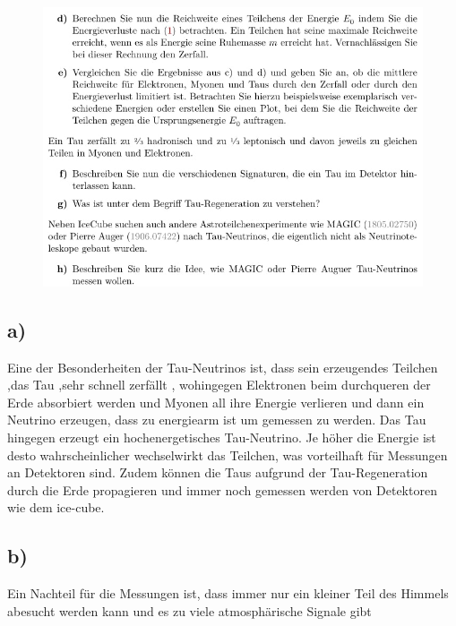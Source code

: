     \begin{figure}[H]
        \centering
        \includegraphics[width=\textwidth]{images/Aufgabe22b.jpg}
        \label{fig:2}
    \end{figure}

\subsection{a)}

    Eine der Besonderheiten der Tau-Neutrinos ist, dass sein erzeugendes Teilchen ,das Tau ,sehr schnell zerfällt
    , wohingegen Elektronen beim durchqueren der Erde absorbiert werden und Myonen all 
    ihre Energie verlieren und dann ein Neutrino erzeugen, dass zu energiearm ist um gemessen zu werden.
    Das Tau hingegen erzeugt ein hochenergetisches Tau-Neutrino. Je höher die Energie ist
    desto wahrscheinlicher wechselwirkt das Teilchen, was vorteilhaft für Messungen an
    Detektoren sind. Zudem können die Taus aufgrund der Tau-Regeneration durch die Erde propagieren
    und immer noch gemessen werden von Detektoren wie dem ice-cube.

\subsection{b)}
Ein Nachteil für die Messungen ist, dass immer nur ein kleiner Teil des Himmels
abesucht werden kann und es zu viele atmosphärische Signale gibt


